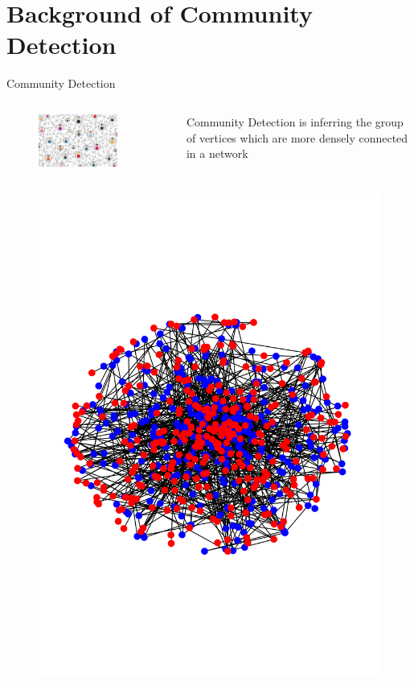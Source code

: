 \documentclass[notheorems]{beamer}
\begin{document}
\section[Background]{Background of Community Detection}
\begin{frame}{Community Detection}
	\begin{columns}
		\begin{figure}
			\includegraphics[width=0.8\textwidth]{cd.png}
		\end{figure}
	Community Detection is inferring the group of vertices which are more
	densely connected in a network
	\end{columns}
	\begin{columns}
		\column{0.33\textwidth}
		\begin{figure}
			\includegraphics[width=\textwidth]{benno2t.pdf}

\end{figure}
\end{columns}
\end{frame}
\end{document}

